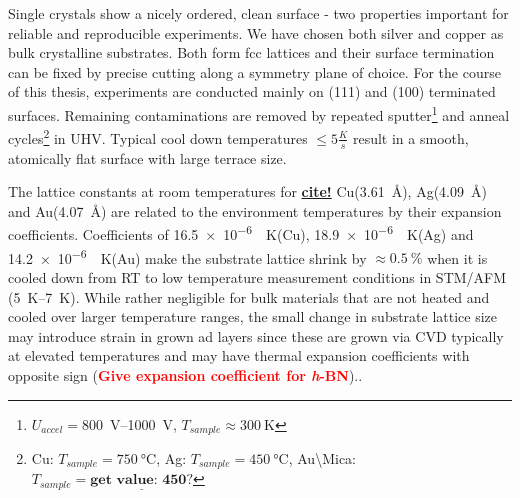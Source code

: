 Single crystals show a nicely ordered, clean surface - two properties important for reliable and reproducible experiments. We have chosen both silver and copper as bulk crystalline substrates. Both form fcc lattices and their surface termination can be fixed by precise cutting along a symmetry plane of choice. For the course of this thesis, experiments are conducted mainly on (111) and (100) terminated surfaces.
Remaining contaminations 
are removed by repeated sputter\footnote{$U_{accel}=$\SIrange{800}{1000}{\volt}, $T_{sample}\approx \SI{300}{\kelvin}$} and anneal cycles\footnote{Cu: $T_{sample}=\SI{750}{\celsius}$, Ag: $T_{sample}=\SI{450}{\celsius}$, Au\textbackslash Mica: $T_{sample}= \underline{\textbf{get value: 450?}}$} in UHV. Typical cool down temperatures $\leq 5 \frac{K}{s}$ result in a smooth, atomically flat surface with large terrace size. 

The lattice constants at room temperatures for \underline{\textbf{cite!}} Cu(\SI{3,61}{\angstrom}), Ag(\SI{4,09}{\angstrom}) and Au(\SI{4,07}{\angstrom}) are related to the environment temperatures by their expansion coefficients.
Coefficients of \SI{16,5e-6}{\per \kelvin}(Cu), \SI{18,9e-6}{\per \kelvin}(Ag) and \SI{14,2e-6}{\per \kelvin}(Au) make the substrate lattice shrink by $\approx \SI{0,5}{\percent}$ when it is cooled down from RT to low temperature measurement conditions in STM/AFM (\SIrange{5}{7}{\kelvin}). While rather negligible for bulk materials that are not heated and cooled over larger temperature ranges, the small change in substrate lattice size may introduce strain in grown ad layers since these are grown via CVD typically at elevated temperatures and may have thermal expansion coefficients with opposite sign (\textcolor{red}{\textbf{Give expansion coefficient for \textit{h}-BN}}).\cite{farwick_zum_hagen_structure_2016}.

